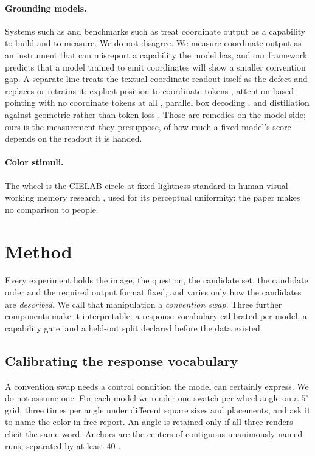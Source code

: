 \documentclass{article}
\begin{document}
\paragraph{Grounding models.} Systems such as \citet{glamm2024} and benchmarks
such as \citet{pointarena2025} treat coordinate output as a capability to build and
to measure. We do not disagree. We measure coordinate output as an instrument that
can misreport a capability the model has, and our framework predicts that a model
trained to emit coordinates will show a smaller convention gap. A separate line
treats the textual coordinate readout itself as the defect and replaces or
retrains it: explicit position-to-coordinate tokens \citep{ruler2025},
attention-based pointing with no coordinate tokens at all \citep{guiactor2025},
parallel box decoding \citep{locateanything2026}, and distillation against
geometric rather than token loss \citep{ioupd2026}. Those are remedies on the
model side; ours is the measurement they presuppose, of how much a fixed model's
score depends on the readout it is handed.

\paragraph{Color stimuli.} The wheel is the CIELAB circle at fixed lightness
standard in human visual working memory research
\citep{zhangluck2008,bayshusain2008}, used for its perceptual uniformity; the
paper makes no comparison to people.

\section{Method}

Every experiment holds the image, the question, the candidate set, the candidate
order and the required output format fixed, and varies only how the candidates are
\emph{described}. We call that manipulation a \emph{convention swap}. Three further
components make it interpretable: a response vocabulary calibrated per model, a
capability gate, and a held-out split declared before the data existed.

\subsection{Calibrating the response vocabulary}
\label{sec:calib}

A convention swap needs a control condition the model can certainly express. We do
not assume one. For each model we render one swatch per wheel angle on a
$5^\circ$ grid, three times per angle under different square sizes and placements,
and ask it to name the color in free report. An angle is retained only if all
three renders elicit the same word. Anchors are the centers of contiguous
unanimously named runs, separated by at least $40^\circ$.
\end{document}
